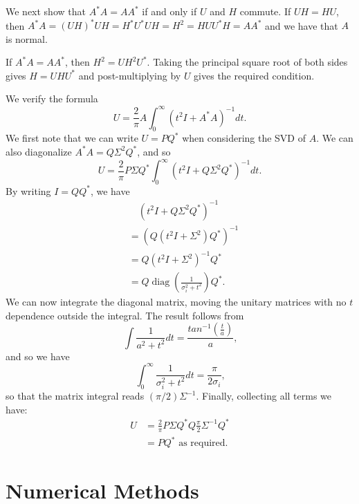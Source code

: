 \documentclass[12pt]{article}
\def\diag{\mathop{\mathrm{diag}}}     %
\begin{document}
We next show that $A^*A = AA^*$ if and only if $U$ and $H$ commute.
If $UH=HU$, then $A^*A = (UH)^*UH = H^*U^*UH = H^2 = HUU^*H = AA^*$
and we have that $A$ is normal.

If $A^*A = AA^*$, then $H^2 = UH^2U^*$. Taking the principal square root of
both sides gives $H = UHU^*$ and post-multiplying by $U$ gives the required
condition.

We verify the formula
\begin{equation} \label{eqn:U-integral}
  U = \frac{2}{\pi}A\int_{0}^{\infty}(t^2I + A^*A)^{-1}dt\text{.}
\end{equation}
We first note that we can write $U=PQ^*$ when considering the SVD of $A$. We
can also diagonalize $A^*A = Q\Sigma^2 Q^*$, and so
\begin{equation}
  U = \frac{2}{\pi}P\Sigma Q^*\int_0^{\infty}(t^2I + Q\Sigma^2 Q^*)^{-1}dt\text{.}
\end{equation}
By writing $I = QQ^*$, we have
\begin{align*}
  &\quad (t^2I + Q\Sigma^2Q^*)^{-1} \\
  & = (Q(t^2I + \Sigma^2)Q^*)^{-1} \\
  & = Q(t^2I + \Sigma^2)^{-1}Q^* \\
  & = Q\diag(\frac{1}{\sigma_i^2 + t^2})Q^*\text{.}
\end{align*}
We can now integrate the diagonal matrix, moving the unitary matrices with no
$t$ dependence outside the integral.
The result follows from
\begin{equation}
  \int\frac{1}{a^2+t^2}dt = \frac{tan^{-1}(\frac{t}{a})}{a}\text{,}
\end{equation}
and so we have
\begin{equation}
  \int_0^{\infty}\frac{1}{\sigma_i^2+t^2}dt = \frac{\pi}{2\sigma_i}\text{,}
\end{equation}
so that the matrix integral reads $(\pi /2)\Sigma^{-1}$.
Finally, collecting all terms we have:
\begin{align*}
  U & = \frac{2}{\pi}P\Sigma Q^*Q\frac{\pi}{2}\Sigma^{-1}Q^* \\
    & = PQ^* \text{ as required.}
\end{align*}

\section{Numerical Methods}
\end{document}
